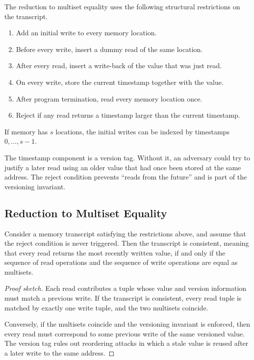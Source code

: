 \documentclass[11pt]{article}
\begin{document}
The reduction to multiset equality uses the following structural restrictions
on the transcript.

\begin{enumerate}
  \item Add an initial write to every memory location.
  \item Before every write, insert a dummy read of the same location.
  \item After every read, insert a write-back of the value that was just read.
  \item On every write, store the current timestamp together with the value.
  \item After program termination, read every memory location once.
  \item Reject if any read returns a timestamp larger than the current
        timestamp.
\end{enumerate}

If memory has $s$ locations, the initial writes can be indexed by timestamps
$0,\ldots,s-1$.

The timestamp component is a version tag.  Without it, an adversary could try
to justify a later read using an older value that had once been stored at the
same address.  The reject condition prevents ``reads from the future'' and is
part of the versioning invariant.

\subsection{Reduction to Multiset Equality}

\begin{proposition}
Consider a memory transcript satisfying the restrictions above, and assume that
the reject condition is never triggered.  Then the transcript is consistent,
meaning that every read returns the most recently written value, if and only if
the sequence of read operations and the sequence of write operations are equal
as multisets.
\end{proposition}

\begin{proof}[Proof sketch]
Each read contributes a tuple whose value and version information must match a
previous write.  If the transcript is consistent, every read tuple is matched
by exactly one write tuple, and the two multisets coincide.

Conversely, if the multisets coincide and the versioning invariant is enforced,
then every read must correspond to some previous write of the same versioned
value.  The version tag rules out reordering attacks in which a stale value is
reused after a later write to the same address.
\end{proof}
\end{document}
